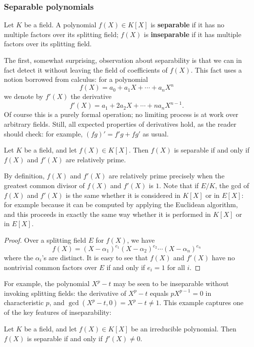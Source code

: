 \subsubsection{Separable polynomials}
\begin{definition}
Let $K$ be a field. A polynomial $f(X)\in K[X]$ is \textbf{separable} if it has no multiple factors over its splitting field; $f(X)$ is \textbf{inseparable} if it has multiple factors over its splitting field.
\end{definition}
The first, somewhat surprising, observation about separability is that we can in fact detect it without leaving the field of coefficients of $f(X)$. This fact uses a notion borrowed from calculus: for a polynomial
\[f(X)=a_0+a_1X+\cdots+a_nX^n\]
we denote by $f'(X)$ the derivative
\[f'(X)=a_1+2a_2X+\cdots+na_nX^{n-1}.\]
Of course this is a purely formal operation; no limiting process is at work over arbitrary fields. Still, all expected properties of derivatives hold, as the reader should check: for example, $(fg)'=f'g+fg'$ as usual.
\begin{proposition}\label{poloynomial separable iff f'}
Let $K$ be a field, and let $f(X)\in K[X]$. Then $f(X)$ is separable if and only if $f(X)$ and $f'(X)$ are relatively prime.
\end{proposition}
By definition, $f(X)$ and $f'(X)$ are relatively prime precisely when the greatest common divisor of $f(X)$ and $f'(X)$ is $1$. Note that if $E/K$, the gcd of $f(X)$ and $f'(X)$ is the same whether it is considered in $K[X]$ or in $E[X]$: for example because it can be computed by applying the Euclidean algorithm, and this proceeds in exactly the same way whether it is performed in $K[X]$ or in $E[X]$.
\begin{proof}
Over a splitting field $E$ for $f(X)$, we have
\[f(X)=(X-\alpha_1)^{e_1}(X-\alpha_2)^{e_2}\cdots(X-\alpha_n)^{e_n}\]
where the $\alpha_i$'s are distinct. It is easy to see that $f(X)$ and $f'(X)$ have no nontrivial common factors over $E$ if and only if $e_i=1$ for all $i$.
\end{proof}
For example, the polynomial $X^p-t$ may be seen to be inseparable without invoking splitting fields: the derivative of $X^p-t$ equals $pX^{p-1}=0$ in characteristic $p$, and $\gcd(X^p-t,0)=X^p-t\neq 1$. This example captures one of the key features of inseparability:
\begin{corollary}\label{insepara zero}
Let $K$ be a field, and let $f(X)\in K[X]$ be an irreducible polynomial. Then $f(X)$ is separable if and only if $f'(X)\neq 0$.
\end{corollary}
